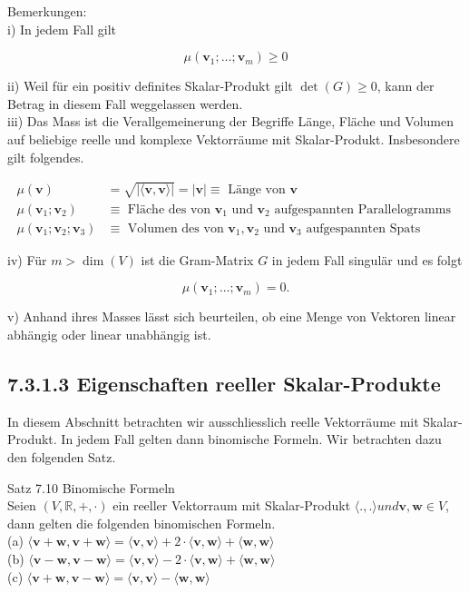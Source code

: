 \documentclass[10pt]{article}
\begin{document}
Bemerkungen:\\
i) In jedem Fall gilt


\begin{equation*}
\mu\left(\mathbf{v}_{1} ; \ldots ; \mathbf{v}_{m}\right) \geq 0 \tag{7.72}
\end{equation*}


ii) Weil für ein positiv definites Skalar-Produkt gilt $\operatorname{det}(G) \geq 0$, kann der Betrag in diesem Fall weggelassen werden.\\
iii) Das Mass ist die Verallgemeinerung der Begriffe Länge, Fläche und Volumen auf beliebige reelle und komplexe Vektorräume mit Skalar-Produkt. Insbesondere gilt folgendes.


\begin{align*}
\mu(\mathbf{v}) & =\sqrt{|\langle\mathbf{v}, \mathbf{v}\rangle|}=|\mathbf{v}| \equiv \text { Länge von } \mathbf{v}  \tag{7.73}\\
\mu\left(\mathbf{v}_{1} ; \mathbf{v}_{2}\right) & \equiv \text { Fläche des von } \mathbf{v}_{1} \text { und } \mathbf{v}_{2} \text { aufgespannten Parallelogramms }  \tag{7.74}\\
\mu\left(\mathbf{v}_{1} ; \mathbf{v}_{2} ; \mathbf{v}_{3}\right) & \equiv \text { Volumen des von } \mathbf{v}_{1}, \mathbf{v}_{2} \text { und } \mathbf{v}_{3} \text { aufgespannten Spats } \tag{7.75}
\end{align*}


iv) Für $m>\operatorname{dim}(V)$ ist die Gram-Matrix $G$ in jedem Fall singulär und es folgt


\begin{equation*}
\mu\left(\mathbf{v}_{1} ; \ldots ; \mathbf{v}_{m}\right)=0 . \tag{7.76}
\end{equation*}


v) Anhand ihres Masses lässt sich beurteilen, ob eine Menge von Vektoren linear abhängig oder linear unabhängig ist.

\subsection*{7.3.1.3 Eigenschaften reeller Skalar-Produkte}
In diesem Abschnitt betrachten wir ausschliesslich reelle Vektorräume mit Skalar-Produkt. In jedem Fall gelten dann binomische Formeln. Wir betrachten dazu den folgenden Satz.

Satz 7.10 Binomische Formeln\\
Seien $(V, \mathbb{R},+, \cdot)$ ein reeller Vektorraum mit Skalar-Produkt $\langle.,$.$\rangle und \mathbf{v}, \mathbf{w} \in V$, dann gelten die folgenden binomischen Formeln.\\
(a) $\langle\mathbf{v}+\mathbf{w}, \mathbf{v}+\mathbf{w}\rangle=\langle\mathbf{v}, \mathbf{v}\rangle+2 \cdot\langle\mathbf{v}, \mathbf{w}\rangle+\langle\mathbf{w}, \mathbf{w}\rangle$\\
(b) $\langle\mathbf{v}-\mathbf{w}, \mathbf{v}-\mathbf{w}\rangle=\langle\mathbf{v}, \mathbf{v}\rangle-2 \cdot\langle\mathbf{v}, \mathbf{w}\rangle+\langle\mathbf{w}, \mathbf{w}\rangle$\\
(c) $\langle\mathbf{v}+\mathbf{w}, \mathbf{v}-\mathbf{w}\rangle=\langle\mathbf{v}, \mathbf{v}\rangle-\langle\mathbf{w}, \mathbf{w}\rangle$
\end{document}
